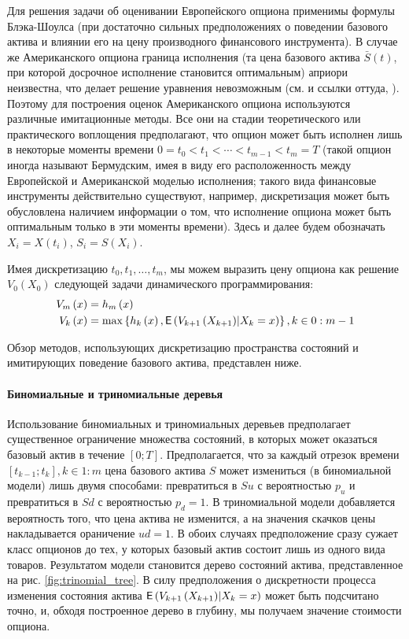 Для решения задачи об оценивании Европейского опциона применимы формулы Блэка-Шоулса (при достаточно сильных предположениях о поведении базового актива и влиянии его на цену производного финансового инструмента). В случае же Американского опциона граница исполнения (та цена базового актива $\bar{S}(t)$, при которой досрочное исполнение становится оптимальным) априори неизвестна, что делает решение уравнения невозможным (см. \cite{Lyuu2007} и ссылки оттуда, \cite{Peskir2006}). Поэтому для построения оценок Американского опциона используются различные имитационные методы. Все они на стадии теоретического или практического воплощения предполагают, что опцион может быть исполнен лишь в некоторые моменты времени $0 = t_0 < t_1 < \cdots < t_{m-1} < t_m=T$ (такой опцион иногда называют Бермудским, имея в виду его расположенность между Европейской и Американской моделью исполнения; такого вида финансовые инструменты действительно существуют, например, дискретизация может быть обусловлена наличием информации о том, что исполнение опциона может быть оптимальным только в эти моменты времени).  Здесь и далее будем обозначать $X_i = X\left(t_i\right)$, $S_i = S\left(X_i\right)$.

Имея дискретизацию $t_0, t_1, \ldots, t_m$, мы можем выразить цену опциона как решение $V_0\left(X_0\right)$ следующей задачи динамического программирования:
\begin{equation}\label{eq:common_recursive_statement}
	\begin{aligned}
		V_m\left(x\right) &= h_m\left(x\right) \\
		V_k\left(x\right) &= \max\left\lbrace h_k\left(x\right), \mathsf{E}\left(V_{k+1}\left(X_{k+1}\right)\middle\vert X_k = x\right)\right\rbrace, k\in 0\mathrel{:}m-1
	\end{aligned}
\end{equation}

Обзор методов, использующих дискретизацию пространства состояний и имитирующих поведение базового актива, представлен ниже.

\paragraph{Биномиальные и триномиальные деревья}
Использование биномиальных и триномиальных деревьев предполагает существенное ограничение множества состояний, в которых может оказаться базовый актив в течение $[0;T]$. Предполагается, что за каждый отрезок времени $\left[t_{k-1};t_k\right], k\in 1:m$ цена базового актива $S$ может измениться (в биномиальной модели) лишь двумя способами: превратиться в $Su$ с вероятностью $p_u$ и превратиться в $Sd$ с вероятностью $p_d=1$. В триномиальной модели добавляется вероятность того, что цена актива не изменится, а на значения скачков цены накладывается ораничение $ud = 1$. В обоих случаях предположение сразу сужает класс опционов до тех, у которых базовый актив состоит лишь из одного вида товаров. Результатом модели становится дерево состояний актива, представленное на рис. \ref{fig:trinomial_tree}. В силу предположения о дискретности процесса изменения состояния актива $\mathsf{E}\left(V_{k+1}\left(X_{k+1}\right)\middle\vert X_k = x\right)$ может быть подсчитано точно, и, обходя построенное дерево в глубину, мы получаем значение стоимости опциона.

